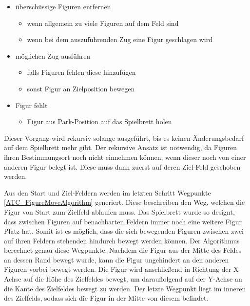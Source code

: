 \begin{itemize}
\tightlist
\item
  überschüssige Figuren entfernen

  \begin{itemize}
  \tightlist
  \item
    wenn allgemein zu viele Figuren auf dem Feld sind
  \item
    wenn bei dem auszuführenden Zug eine Figur geschlagen wird
  \end{itemize}
\item
  möglichen Zug ausführen

  \begin{itemize}
  \tightlist
  \item
    falls Figuren fehlen diese hinzufügen
  \item
    sonst Figur an Zielposition bewegen
  \end{itemize}
\item
  Figur fehlt

  \begin{itemize}
  \tightlist
  \item
    Figur aus Park-Position auf das Spielbrett holen
  \end{itemize}
\end{itemize}

Dieser Vorgang wird rekursiv solange ausgeführt, bis es keinen
Änderungsbedarf auf dem Spielbrett mehr gibt. Der rekursive Ansatz ist
notwendig, da Figuren ihren Bestimmungsort noch nicht einnehmen können,
wenn dieser noch von einer anderen Figur belegt ist. Diese muss dann
zuerst auf deren Ziel-Feld geschoben werden.

Aus den Start und Ziel-Feldern werden im letzten Schritt Wegpunkte
\ref{ATC_FigureMoveAlgorithm} generiert. Diese beschreiben den Weg,
welchen die Figur von Start zum Zielfeld ablaufen muss. Das Spielbrett
wurde so designt, dass zwischen Figuren auf benachbarten Feldern immer
noch eine weitere Figur Platz hat. Somit ist es möglich, dass die sich
bewegenden Figuren zwischen zwei auf ihren Feldern stehenden hindurch
bewegt werden können. Der Algorithmus berechnet genau diese Wegpunkte.
Nachdem die Figur aus der Mitte des Feldes an dessen Rand bewegt wurde,
kann die Figur ungehindert an den anderen Figuren vorbei bewegt werden.
Die Figur wird anschließend in Richtung der X-Achse auf die Höhe des
Zielfeldes bewegt, um darauffolgend auf der Y-Achse an die Kante des
Zielfeldes bewegt zu werden. Der letzte Wegpunkt liegt im inneren des
Zielfelds, sodass sich die Figur in der Mitte von diesem befindet.

